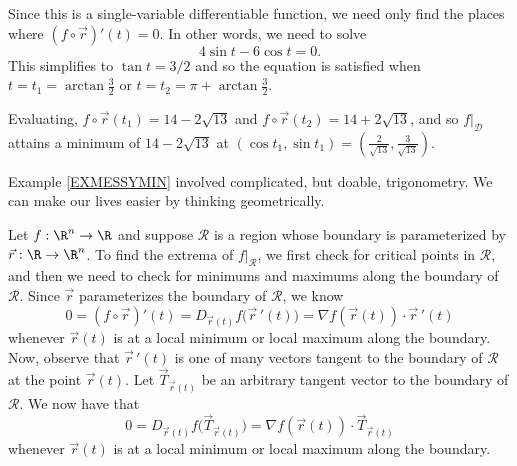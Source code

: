 \begin{example}
\begin{center}
	\end{center}

	Since this is a single-variable differentiable function, we need only find the places
	where $(f\circ \vec r)'(t)=0$.  In other words, we need to solve
	\[
		4\sin t-6\cos t=0.
	\]
	This simplifies to $\tan t = 3/2$ and so the equation is satisfied when $t=t_1=\arctan \tfrac{3}{2}$
	or $t=t_2=\pi+\arctan \tfrac{3}{2}$.

	Evaluating, $f\circ \vec r(t_1)=14-2\sqrt{13}$ and $f\circ \vec r(t_2)=14+2\sqrt{13}$, and so 
	$f\big|_{\mathcal D}$ attains a minimum of $14-2\sqrt{13}$ at $(\cos t_1,\sin t_1)=(\tfrac{2}{\sqrt{13}},
	\tfrac{3}{\sqrt{13}})$.
\end{example}

Example \ref{EXMESSYMIN} involved complicated, but doable, trigonometry.  We can make our lives
easier by thinking geometrically.

Let $f:\R^n\to \R$ and suppose $\mathcal R$ is a region whose boundary is parameterized by
$\vec r:\R\to\R^n$.  To find the extrema of $f\big|_{\mathcal R}$, we first check for
critical points in $\mathcal R$, and then we need to check for minimums and maximums along
the boundary of $\mathcal R$.  Since $\vec r$ parameterizes the boundary of $\mathcal R$, we know
\[
	0=(f\circ \vec r)'(t) = D_{\vec r(t)}f\big(\vec r\,'(t)\big)=\nabla f(\vec r(t))\cdot \vec r\,'(t)
\]
whenever $\vec r(t)$ is at a local minimum or local maximum along the boundary.  Now, observe
that $\vec r\,'(t)$ is one of many vectors tangent to the boundary of $\mathcal R$
at the point $\vec r(t)$.  Let $\vec T_{\vec r(t)}$ be an arbitrary tangent vector
to the boundary of $\mathcal R$.  We now have that 
\[
	0= D_{\vec r(t)}f\big(\vec T_{\vec r(t)}\big)=\nabla f(\vec r(t))\cdot \vec T_{\vec r(t)}
\]
whenever $\vec r(t)$ is at a local minimum or local maximum along the boundary.

